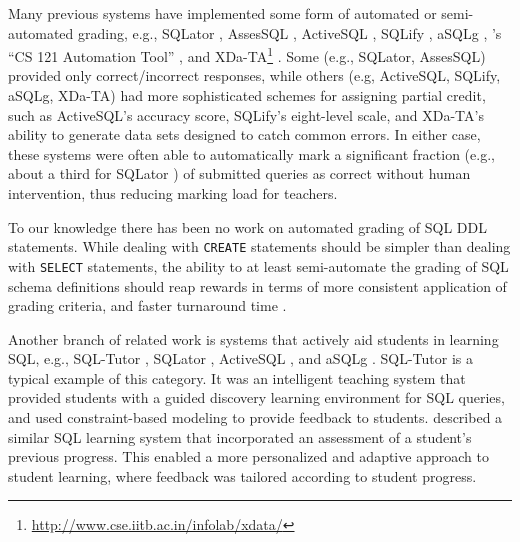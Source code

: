 \documentclass[sigconf, review, anonymous, capitalise]{acmart}
\begin{document}
Many previous systems have implemented some form of automated or semi-automated grading, e.g., SQLator \cite{Sadiq.S-2004a-SQLator}, AssesSQL \cite{Prior.J-2004a-Backwash}, ActiveSQL \cite{Russell.G-2004a-Improving,Russell.G-2005a-Online}, SQLify \cite{Dekeyser.S-2007a-Computer}, aSQLg \cite{Kleiner.C-2013a-Automated}, \citeauthor{Gong.A-2015a-CS-121-Automation}'s ``CS 121 Automation Tool'' \cite{Gong.A-2015a-CS-121-Automation}, and XDa-TA\footnote{\url{http://www.cse.iitb.ac.in/infolab/xdata/}} \cite{Bhangdiya.A-2015a-XDa-TA,Chandra.B-2015a-Data,Chandra.B-2016a-Partial}. Some (e.g., SQLator, AssesSQL) provided only correct/incorrect responses, while others (e.g, ActiveSQL, SQLify, aSQLg, XDa-TA) had more sophisticated schemes for assigning partial credit, such as ActiveSQL's accuracy score, SQLify's eight-level scale, and XDa-TA's ability to generate data sets designed to catch common errors. In either case, these systems were often able to automatically mark a significant fraction (e.g., about a third for SQLator \cite{Sadiq.S-2004a-SQLator}) of submitted queries as correct without human intervention, thus reducing marking load for teachers.

To our knowledge there has been no work on automated grading of SQL DDL statements. While dealing with \texttt{CREATE} statements should be simpler than dealing with \texttt{SELECT} statements, the ability to at least semi-automate the grading of SQL schema definitions should reap rewards in terms of more consistent application of grading criteria, and faster turnaround time \cite{Douce.C-2005a-Automatic,Russell.G-2004a-Improving,Dekeyser.S-2007a-Computer,Prior.J-2004a-Backwash}.

Another branch of related work is systems that actively aid students in learning SQL, e.g., SQL-Tutor \cite{Mitrovic.A-1998a-Learning}, SQLator \cite{Sadiq.S-2004a-SQLator}, ActiveSQL \cite{Russell.G-2004a-Improving}, and aSQLg \cite{Kleiner.C-2013a-Automated}. SQL-Tutor is a typical example of this category. It was an intelligent teaching system that provided students with a guided discovery learning environment for SQL queries, and used constraint-based modeling \cite{Ohlsson.S-1992a-Constraint-based,Ohlsson.S-2016a-Constraint-based} to provide feedback to students. \citeauthor{Kenny.C-2005a-Automated} \cite{Kenny.C-2005a-Automated} described a similar SQL learning system that incorporated an assessment of a student's previous progress. This enabled a more personalized and adaptive approach to student learning, where feedback was tailored according to student progress.
\end{document}
